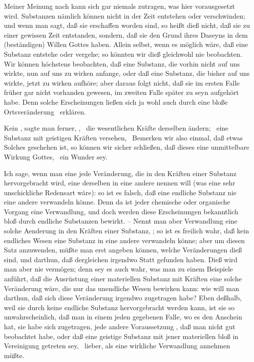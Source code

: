 Meiner Meinung nach kann sich gar niemals zutragen, was hier vorausgesetzt wird. Substanzen nämlich können nicht in der Zeit entstehen oder verschwinden; und wenn man sagt, daß sie erschaffen worden sind, so heißt dieß nicht, daß sie zu einer gewissen Zeit entstanden, sondern, daß sie den Grund ihres Daseyns in dem (beständigen) Willen Gottes haben. Allein selbst, wenn es möglich wäre, daß eine Substanz entstehe oder vergehe; so könnten wir dieß gleichwohl nie beobachten. Wir können höchstens beobachten, daß eine Substanz, die vorhin nicht auf uns wirkte, nun auf uns zu wirken anfange, oder daß eine Substanz, die bisher auf uns wirkte, jetzt zu wirken aufhöre; aber daraus folgt nicht, daß sie im ersten Falle früher gar nicht vorhanden gewesen, im zweiten Falle später zu seyn aufgehört habe. Denn solche Erscheinungen ließen sich ja wohl auch durch eine bloße Ortsveränderung \udgl\  erklären.
\begin{aufzb}\setcounter{enumi}{1}
\item Kein , sagte man ferner, , \dh\ die wesentlichen Kräfte derselben ändern; \zB\ eine  Substanz mit geistigen Kräften versehen, \udgl\  Bemerken wir also einmal, daß etwas Solches geschehen ist, so können wir sicher schließen, daß dieses eine unmittelbare Wirkung Gottes, \dh\ ein Wunder sey.
\end{aufzb}\par
Ich sage, wenn man eine jede Veränderung, die in den Kräften einer Substanz hervorgebracht wird, eine  derselben in eine andere nennen will (was eine sehr unschickliche Redensart wäre): so ist es falsch, daß eine endliche Substanz nie eine andere verwandeln könne. Denn da ist jeder chemische oder organische Vorgang eine Verwandlung, und doch werden diese Erscheinungen bekanntlich bloß durch endliche Substanzen bewirkt. -- Nennt man aber Verwandlung eine solche Aenderung in den Kräften einer Substanz, ; so ist es freilich wahr, daß kein endliches Wesen eine Substanz in eine andere verwandeln könne; aber um diesen Satz anzuwenden, müßte man erst angeben können, welche Veränderungen dieß sind, und darthun, daß dergleichen irgendwo Statt gefunden haben. Dieß wird man aber nie vermögen; denn sey es auch wahr, was man zu einem Beispiele anführt, daß die Ausrüstung einer {materiellen} Substanz mit  Kräften eine solche Veränderung wäre, die nur das unendliche Wesen bewirken kann: wie will man darthun, daß sich diese Veränderung irgendwo zugetragen habe? Eben deßhalb, weil sie durch keine endliche Substanz hervorgebracht werden kann, ist sie so unwahrscheinlich, daß man in einem jeden gegebenen Falle, wo es den Anschein hat, sie habe sich zugetragen, jede andere Voraussetzung \zB , daß man nicht gut beobachtet habe, oder daß eine geistige Substanz mit jener materiellen bloß in Vereinigung getreten sey, \udgl\  lieber, als eine wirkliche Verwandlung annehmen müßte.
